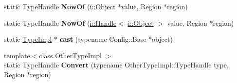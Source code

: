\begin{DoxyCompactItemize}
\item 
\hypertarget{classv8_1_1internal_1_1_type_impl_a65a60d124bfbcd37306090dcd9c95e7c}{}static Type\+Handle {\bfseries Now\+Of} (\hyperlink{classv8_1_1internal_1_1_object}{i\+::\+Object} $\ast$value, Region $\ast$region)\label{classv8_1_1internal_1_1_type_impl_a65a60d124bfbcd37306090dcd9c95e7c}

\item 
\hypertarget{classv8_1_1internal_1_1_type_impl_a2ee801e3e4aaee8cc9c91088a42f108e}{}static Type\+Handle {\bfseries Now\+Of} (\hyperlink{classv8_1_1internal_1_1_handle}{i\+::\+Handle}$<$ \hyperlink{classv8_1_1internal_1_1_object}{i\+::\+Object} $>$ value, Region $\ast$region)\label{classv8_1_1internal_1_1_type_impl_a2ee801e3e4aaee8cc9c91088a42f108e}

\item 
\hypertarget{classv8_1_1internal_1_1_type_impl_a99f8e8efaf01b46d9cba1e5538881272}{}static \hyperlink{classv8_1_1internal_1_1_type_impl}{Type\+Impl} $\ast$ {\bfseries cast} (typename Config\+::\+Base $\ast$object)\label{classv8_1_1internal_1_1_type_impl_a99f8e8efaf01b46d9cba1e5538881272}

\item 
\hypertarget{classv8_1_1internal_1_1_type_impl_a4439c643c0c1b20b9ef2445471ac2ff5}{}{\footnotesize template$<$class Other\+Type\+Impl $>$ }\\static Type\+Handle {\bfseries Convert} (typename Other\+Type\+Impl\+::\+Type\+Handle type, Region $\ast$region)\label{classv8_1_1internal_1_1_type_impl_a4439c643c0c1b20b9ef2445471ac2ff5}

\end{DoxyCompactItemize}

